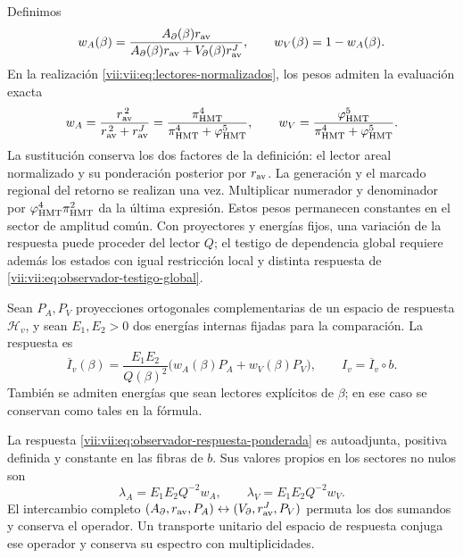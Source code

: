 Definimos
\[
 w_A(\beta)=
 \frac{A_\partial(\beta)r_{\rm av}}
 {A_\partial(\beta)r_{\rm av}+V_\partial(\beta)r_{\rm av}^{J}},
 \qquad w_V(\beta)=1-w_A(\beta).
\]
En la realización \eqref{vii:vii:eq:lectores-normalizados}, los pesos
admiten la evaluación exacta
\begin{equation}
 w_A=\frac{r_{\rm av}^{\,2}}{r_{\rm av}^{\,2}+r_{\rm av}^{J}}
     =\frac{\pi_{\rm HMT}^{4}}
            {\pi_{\rm HMT}^{4}+\varphi_{\rm HMT}^{5}},\qquad
 w_V=\frac{\varphi_{\rm HMT}^{5}}
            {\pi_{\rm HMT}^{4}+\varphi_{\rm HMT}^{5}}.
 \label{vii:vii:eq:pesos-amplitud-comun}
\end{equation}
La sustitución conserva los dos factores de la definición: el lector
areal normalizado y su ponderación posterior por \(r_{\rm av}\).
La generación y el marcado regional del retorno se realizan una vez.
Multiplicar numerador
y denominador por \(\varphi_{\rm HMT}^4\pi_{\rm HMT}^2\)
da la última expresión. Estos pesos permanecen constantes en el
sector de amplitud común. Con proyectores y energías fijos, una
variación de la respuesta puede proceder del lector \(Q\);
el testigo de dependencia global requiere además los estados con
igual restricción local y distinta respuesta de
\eqref{vii:vii:eq:observador-testigo-global}.


Sean \(P_A,P_V\) proyecciones ortogonales complementarias de un
espacio de respuesta \(\mathcal H_v\), y sean \(E_1,E_2>0\)
dos energías internas fijadas para la comparación. La respuesta es
\begin{equation}
 \overline I_v(\beta)=\frac{E_1E_2}{Q(\beta)^2}
       \bigl(w_A(\beta)P_A+w_V(\beta)P_V\bigr),
 \qquad I_v=\overline I_v\circ b.
 \label{vii:vii:eq:observador-respuesta-ponderada}
\end{equation}
También se admiten energías que sean lectores explícitos de
\(\beta\); en ese caso se conservan como tales en la fórmula.

\begin{proposition}
\label{vii:vii:prop:observador-respuesta-positiva}
La respuesta \eqref{vii:vii:eq:observador-respuesta-ponderada} es
autoadjunta, positiva definida y constante en las fibras de \(b\).
Sus valores propios en los sectores no nulos son
\[
 \lambda_A=E_1E_2Q^{-2}w_A,\qquad
 \lambda_V=E_1E_2Q^{-2}w_V.
\]
El intercambio completo
\((A_\partial,r_{\rm av},P_A)
 \leftrightarrow(V_\partial,r_{\rm av}^{J},P_V)\)
permuta los dos sumandos y conserva el operador. Un transporte
unitario del espacio de respuesta conjuga ese operador y conserva
su espectro con multiplicidades.
\end{proposition}

